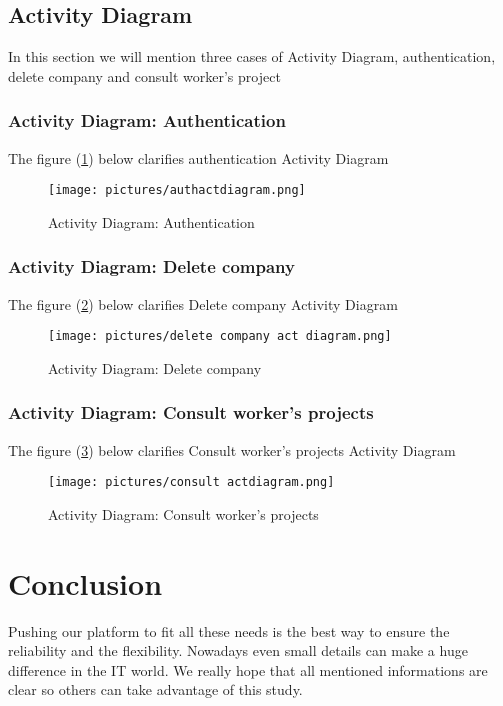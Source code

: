 \documentclass[12pt]{report}
\begin{document}
\subsection{Activity Diagram}
In this section we will mention three cases of Activity Diagram, authentication, delete company and consult worker's project
\subsubsection{Activity Diagram: Authentication}
The figure (\ref{fig:authseqdiagram}) below clarifies authentication Activity Diagram


\begin{figure}[!htbp]

        \centering
    \texttt{[image: pictures/authactdiagram.png]}
    \caption{Activity Diagram: Authentication}
    \label{fig:authseqdiagram}
\end{figure}

\pagebreak
\subsubsection{Activity Diagram: Delete company}
The figure (\ref{fig:deletecmactdiagram}) below clarifies Delete company Activity Diagram

\begin{figure}[!htbp]

        \centering
    \texttt{[image: pictures/delete company act diagram.png]}
    \caption{Activity Diagram: Delete company}
    \label{fig:deletecmactdiagram}
\end{figure}

\pagebreak

\subsubsection{Activity Diagram: Consult worker's projects}
The figure (\ref{fig:consultactdiagram}) below clarifies Consult worker's projects Activity Diagram

\begin{figure}[!htbp]

        \centering
    \texttt{[image: pictures/consult actdiagram.png]}
    \caption{Activity Diagram: Consult worker's projects}
    \label{fig:consultactdiagram}
\end{figure}


\section*{Conclusion}
Pushing our platform to fit all these needs is the best way to ensure the reliability and the flexibility. Nowadays even small details can make a huge difference in the IT world.
We really hope that all mentioned informations are clear so others can take advantage of this study.
\end{document}
